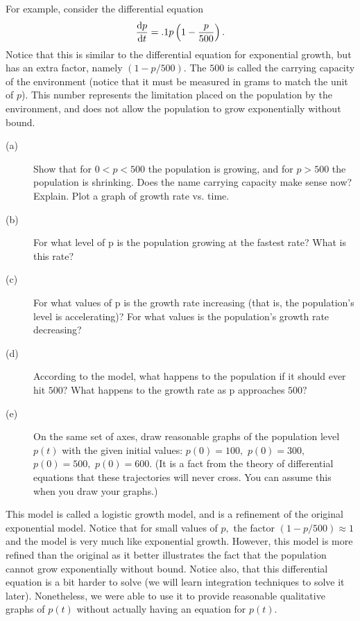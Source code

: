 For example, consider the differential equation
$$
\frac{\text{d}{p}}{\text{d}{t}}=.1p\left(1-\frac{p}{500}\right).
$$
Notice that this is similar to the differential equation for
exponential growth, but has an extra factor, namely $(1-p/500).$  The
$500$ is called the carrying capacity of the environment (notice that it
must be measured in grams to match the unit of $p$).  This number
represents the limitation placed on the population by the environment,
and does not allow the population to grow exponentially without bound.

\begin{embeddedproblem}{}
  \begin{description}
  \item[(a)] Show that for $0<p<500$ the population is growing, and
    for $p>500$ the population is shrinking.  Does the name carrying
    capacity make sense now?  Explain.  Plot a graph of growth rate
    vs. time.
  \item[(b)]  For what level of p is the population growing at the fastest
    rate?  What is this rate?
  \item[(c)]  For what values of p is the growth rate increasing (that is,
    the population's level is accelerating)?  For what values is the
    population's growth rate decreasing?
  \item[(d)] According to the model, what happens to the population if it
    should ever hit $500?$  What happens to the growth rate as p
    approaches $500?$
  \item[(e)] On the same set of axes, draw reasonable graphs of the
    population level $p(t)$ with the given initial values:
    $p(0)=100,$ $p(0)=300,$ $p(0)=500,$ $p(0)=600.$  (It is a fact from the
    theory of differential equations that these trajectories will
    never cross.  You can assume this when you draw your graphs.)
  \end{description}


This model is called a logistic growth model, and is a refinement of
the original exponential model.  Notice that for small values of $p,$ 
the factor $(1-p/500)\approx 1$ and the model is very much like exponential
growth.  However, this model is more refined than the original as it
better illustrates the fact that the population cannot grow
exponentially without bound.  Notice also, that this differential
equation is a bit harder to solve (we will learn integration
techniques to solve it later).  Nonetheless, we were able to use it to
provide reasonable qualitative graphs of $p(t)$ without actually having
an equation for $p(t).$ 
\end{embeddedproblem}

